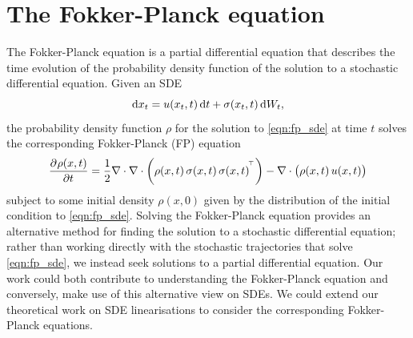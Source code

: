 \section{The Fokker-Planck equation}\label{sec:disc_fp}
The Fokker-Planck equation is a partial differential equation that describes the time evolution of the probability density function of the solution to a stochastic differential equation.
Given an SDE
\begin{equation}
	\dif x_t = u\!\left(x_t,t\right)\dif t + \sigma\!\left(x_t,t\right)\dif W_t,
	\label{eqn:fp_sde}
\end{equation}
the probability density function \(\rho\) for the solution to \cref{eqn:fp_sde} at time \(t\) solves the corresponding Fokker-Planck (FP) equation \citep{Risken_2012_FokkerPlanckEquationMethods}
\begin{equation}
	\dpd{\rho\!\left(x,t\right)}{t} = \frac12\nabla\cdot\nabla\cdot\left(\rho\!\left(x,t\right)\sigma\!\left(x,t\right)\sigma\!\left(x,t\right)^{\T}\right) - \nabla\cdot\left(\rho\!\left(x,t\right) u\!\left(x,t\right)\right)
	\label{eqn:fp_eqn}
\end{equation}
subject to some initial density \(\rho\!\left(x,0\right)\) given by the distribution of the initial condition to \cref{eqn:fp_sde}.
Solving the Fokker-Planck equation provides an alternative method for finding the solution to a stochastic differential equation; rather than working directly with the stochastic trajectories that solve \cref{eqn:fp_sde}, we instead seek solutions to a partial differential equation.
Our work could both contribute to understanding the Fokker-Planck equation and conversely, make use of this alternative view on SDEs.
We could extend our theoretical work on SDE linearisations to consider the corresponding Fokker-Planck equations.
